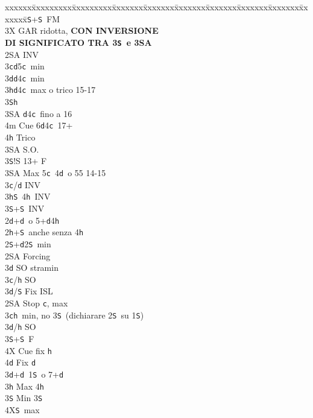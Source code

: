 \documentclass[a4paper,italian]{article}
\newcommand{\BS}{\small{\texttt{S}}}
\newcommand{\BC}{\small{\texttt{c}}}
\newcommand{\BD}{\small{\texttt{d}}}
\newcommand{\BH}{\small{\texttt{h}}}
\newenvironment{bidtable}
{\begin{tabbing}

    xxxxxx\=xxxxxxxxx\=xxxxxxxxx\=xxxxxxx\=xxxxxxx\=xxxxxxx\=xxxxxxx\=xxxxxxx\=xxxxxxx\=xxxxxxx\=\kill}
{\end{tabbing} }%
\begin{document}
\begin{multicols}{2}
\begin{bidtable}
        3\BS {}+\BS\ FM\-\\
        3X \> GAR ridotta, \textbf{CON INVERSIONE}\+\\
        \textbf{DI SIGNIFICATO TRA 3\BS\ e 3\small{SA}}\-\-\\
        2\small{SA} \> INV\+\\
        3\BC {}\BD 5\BC\ min\\
        3\BD {}\BD 4\BC\ min\\
        3\BH {}\BD 4\BC\ max o trico 15-17\+\\
        3\BS {}\BH \+\\
        3\small{SA} \BD 4\BC\ fino a 16\\
        4m \> Cue 6\BD 4\BC\ 17+\\
        4\BH \> Trico\-\\
        3\small{SA} \> S.O.\-\\
        3\BS {}!S 13+ F\\
        3\small{SA} \> Max 5\BC\ 4\BD\ o 55 14-15\-\\
        3\BC/\BD \> INV\\
        3\BH {}\BS\ 4\BH\ INV\\
        3\BS {}+\BS\ INV\-\\
        2\BD {}+\BD\ o 5+\BD4\BH\+\\
        2\BH {}+\BS\ anche senza 4\BH\+\\
        2\BS {}+\BD 2\BS\ min \+\\
        2\small{SA} \> Forcing \+\\
        3\BD \> SO stramin \-\\
        3\BC/\BH\> SO\\
        3\BD/\BS \> Fix ISL\-\\
        2\small{SA} \> Stop \BC, max\\
        3\BC {}\BH\ min, no 3\BS\ (dichiarare 2\BS\ su 1\BS)\+\\
        3\BD/\BH\> SO\\
        3\BS{}+\BS\ F\\
        4X\> Cue fix \BH\\
        4\BD\> Fix \BD\-\\
        3\BD{}+\BD\ 1\BS\ o 7+\BD\\
        3\BH\> Max 4\BH\\
        3\BS\> Min 3\BS\\
        4X\BS\ max\-\-\\


\end{bidtable}
\end{multicols}
\end{document}
